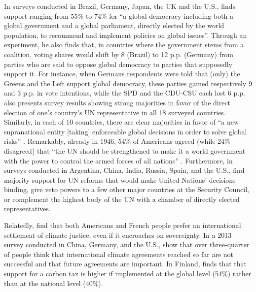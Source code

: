 In surveys conducted in Brazil, Germany, Japan, the UK and the U.S.,  finds support ranging from 55\% to 74\% for ``a global democracy including both a global government and a global parliament, directly elected by the world population, to recommend and implement policies on global issues''. %
Through an experiment, he also finds that, in countries where the government stems from a coalition, voting shares would shift by 8 (Brazil) to 12 p.p. (Germany) from parties who are said to oppose global democracy to parties that supposedly support it. For instance, when Germans respondents were told that (only) the Greens and the Left support global democracy, these parties gained respectively 9 and 3 p.p. in vote intentions, while the SPD and the CDU-CSU each lost 6 p.p. 
 also presents survey results showing strong majorities in favor of the direct election of one's country's UN representative in all 18 surveyed countries. %
Similarly, in each of 10 countries, there are clear majorities in favor of ``a new supranational entity [taking] enforceable global decisions in order to solve global risks'' . Remarkably, already in 1946, 54\% of Americans agreed (while 24\% disagreed) that ``the UN should be strengthened to make it a world government with the power to control the armed forces of all nations'' . 
Furthermore, in surveys conducted in Argentina, China, India, Russia, Spain, and the U.S.,  find majority support for UN reforms that would make United Nations' decisions binding, give veto powers to a few other major countries at the Security Council, or complement the highest body of the UN with a chamber of directly elected representatives. 

Relatedly,  find that both Americans and French people prefer an international settlement of climate justice, even if it encroaches on sovereignty. In a 2013 survey conducted in China, Germany, and the U.S.,  show that over three-quarter of people think that international climate agreements reached so far are not successful and that future agreements are important. %
In Finland,  finds that that support for a carbon tax is higher if implemented at the global level (54\%) rather than at the national level (40\%).

